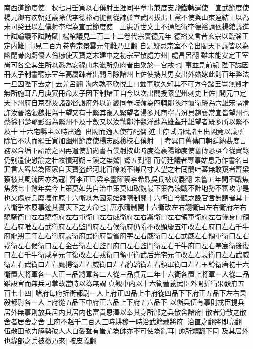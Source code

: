 南西道節度使　秋七月壬寅以右僕射王涯同平章事兼度支鹽鐵轉運使　宣武節度使楊元卿有疾朝廷議除代李德裕請徙劉從諫於宣武因拔出上黨不使與山東連結上以為未可癸丑以左僕射李程為宣武節度使　上患近世文士不通經術李德裕請依楊綰議進士試論議不試詩賦|{
	楊綰議見二百二十二卷代宗廣德元年}
德裕又言昔玄宗以臨淄王定内難|{
	事見二百九卷睿宗景雲元年難乃旦翻}
自是疑忌宗室不令出閤天下議皆以為幽閉骨肉虧傷人倫曏使天寶之末建中之初宗室散處方州|{
	處昌呂翻}
雖未能安定王室尚可各全其生所以悉為安祿山朱泚所魚肉者由聚於一宫故也|{
	事並見前紀}
陛下誠因冊太子制書聽宗室年高屬踈者出閤且除諸州上佐使擕其男女出外婚嫁此則百年弊法一旦因陛下去之|{
	去羌呂翻}
海内孰不欣悦上曰兹事朕久知其不可方今諸王豈無賢才無所施耳八月庚寅冊命太子因下制諸王自今以次出閤授緊望州刺史上佐|{
	開元中定天下州府自京都及諸都督護府外以近畿同華岐蒲為四輔鄭陜汴懷衛絳為六雄宋亳滑許汝晉洺虢魏相為十望又有十緊其後入緊望者浸多凡商寜青汾貝趙襄常宣皆望州也蔡徐鄆楚鄂彭蜀為緊州不及十數又以汝虢鄭汴魏洋蘇為雄蓋升雄望者既多所以緊不及十}
十六宅縣主以時出適|{
	出閤而適人使有配偶}
進士停試詩賦諸王出閤竟以議所除官不决而罷壬寅加幽州節度使楊志誠檢校右僕射　|{
	考異曰舊傳曰朝廷納裴度言務以含垢下詔諭之因再遣使加尚書右僕射按此時度為襄陽節度使舊傳恐誤今從實錄}
仍别遣使慰諭之杜牧憤河朔三鎭之桀驁|{
	驁五到翻}
而朝廷議者專事姑息乃作書名曰罪言大畧以為國家自天寶盗起河北百餘城不得尺寸人望之若囘鶻吐蕃無敢窺者齊梁蔡被其風流因亦為寇|{
	齊李正已梁李靈曜蔡李希烈吳氏被皮義翻}
未嘗五年間不戰焦焦然七十餘年矣今上策莫如先自治中策莫如取魏最下策為浪戰不計地勢不審攻守是也又傷府兵廢壞作原十六衛以為國家始踵隋制開十六衛自今觀之設官言無謂者其十六衛乎本原事迹其實天下之大命也|{
	唐承隋制開十六衛改左右翊衛曰左右衛府左右驍騎衛曰左右驍衛府左右屯衛曰左右威衛府左右禦衛曰左右領軍衛府左右備身曰領左右府唯左右武衛府左右監門府左右候衛府仍隋不改顯慶五年改左右府曰左右千牛府龍朔二年左右衛府驍衛府武衛府皆省府字左右威衛曰左右武威左右領軍衛曰左右戎衛左右候衛曰左右金吾衛左右監門府曰左右監門衛左右千牛府曰左右奉宸衛後復曰左右千牛衛咸亨元年復改左右戎衛曰領軍衛武后光宅元年改左右驍衛曰左右武威衛左右武衛曰左右鷹揚衛左右威衛曰左右豹韜衛左右領軍衛曰左右玉鈐衛唐初十六衛置大將軍各一人正三品將軍各二人從三品貞元二年十六衛各置上將軍一人從二品雖設官而無兵可掌故當時以為無謂}
貞觀中内以十六衛蓄養武臣外開折衝果毅府五百七十四|{
	諸府每府折衝都尉一人上府正四品上中府從四品下下府正五品下左右果毅都尉各一人上府從五品下中府正六品上下府五六品下}
以儲兵伍有事則戎臣提兵居外無事則放兵居内其居内也富貴恩澤以奉其身所部之兵散舍諸府|{
	散者分散之散舍者居舍之舍}
上府不越千二百人三時耕稼一時治武籍藏將府|{
	治直之翻將即亮翻}
伍散田畝力解勢破人人自愛雖有蚩尤為帥亦不可使為亂耳|{
	帥所類翻下同}
及其居外也緣部之兵被檄乃來|{
	被皮義翻}
